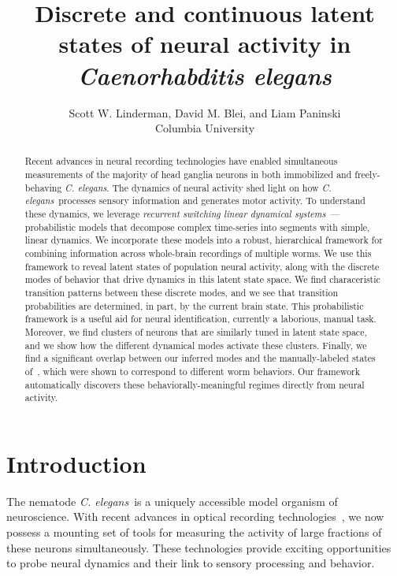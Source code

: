 \documentclass{article}
\title{Discrete and continuous latent states of neural activity in \textit{Caenorhabditis elegans}}
\author{Scott W. Linderman,
  David M. Blei,
  and
  Liam Paninski
  \\
  Columbia University
}
\newcommand{\celegans}{\textit{C. elegans}}
\begin{document}
\maketitle

\begin{abstract}
  Recent advances in neural recording technologies have enabled
  simultaneous measurements of the majority of head ganglia neurons in
  both immobilized and freely-behaving \celegans.  The dynamics of
  neural activity shed light on how \celegans~processes sensory
  information and generates motor activity.  To understand these
  dynamics, we leverage \emph{recurrent switching linear dynamical
    systems}~\citep{linderman2017recurrent}---probabilistic models
  that decompose complex time-series into segments with simple, linear
  dynamics. We incorporate these models into a robust, hierarchical
  framework for combining information across whole-brain recordings of
  multiple worms.  We use this framework to reveal latent states of
  population neural activity, along with the discrete modes of
  behavior that drive dynamics in this latent state space.  We find
  characeristic transition patterns between these discrete modes, and
  we see that transition probabilities are determined, in part, by the
  current brain state.  This probabilistic framework is a useful aid
  for neural identification, currently a laborious, manual task.
  Moreover, we find clusters of neurons that are similarly tuned in
  latent state space, and we show how the different dynamical modes
  activate these clusters.  Finally, we find a significant overlap
  between our inferred modes and the manually-labeled states
  of~\citet{kato2015global}, which were shown to correspond to
  different worm behaviors. Our framework automatically discovers
  these behaviorally-meaningful regimes directly from neural activity.
\end{abstract}

\section{Introduction}
The nematode \celegans~is a uniquely accessible model organism of
neuroscience. With recent advances in optical recording
technologies~\citep{schrodel2013brain, prevedel2014simultaneous,
  nguyen2016whole}, we now possess a mounting set of tools for
measuring the activity of large fractions of these neurons
simultaneously. These technologies provide exciting opportunities to
probe neural dynamics and their link to sensory
processing and behavior.
\end{document}
